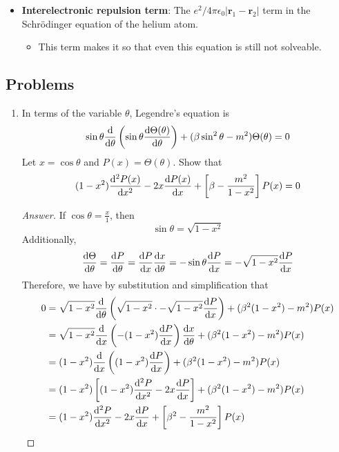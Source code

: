 \documentclass[../notes.tex]{subfiles}
\begin{document}
\begin{itemize}
\begin{equation*}
    \end{equation*}
    \item \textbf{Interelectronic repulsion term}: The $e^2/4\pi\epsilon_0|\mathbf{r}_1-\mathbf{r}_2|$ term in the Schr\"{o}dinger equation of the helium atom.
    \begin{itemize}
        \item This term makes it so that even this equation is still not solveable.
    \end{itemize}
\end{itemize}


\subsection*{Problems}
\begin{enumerate}[label={\textbf{6-\arabic*.}},ref={6-\arabic*}]
    \item \label{prb:6-2}In terms of the variable $\theta$, Legendre's equation is
    \begin{equation*}
        \sin\theta\dv{\theta}\left( \sin\theta\dv{\Theta(\theta)}{\theta} \right)+(\beta\sin^2\theta-m^2)\Theta(\theta) = 0
    \end{equation*}
    Let $x=\cos\theta$ and $P(x)=\Theta(\theta)$. Show that
    \begin{equation*}
        (1-x^2)\dv[2]{P(x)}{x}-2x\dv{P(x)}{x}+\left[ \beta-\frac{m^2}{1-x^2} \right]P(x) = 0
    \end{equation*}
    \begin{proof}[Answer]
        If $\cos\theta=\frac{x}{1}$, then
        \begin{equation*}
            \sin\theta = \sqrt{1-x^2}
        \end{equation*}
        Additionally,
        \begin{equation*}
            \dv{\Theta}{\theta} = \dv{P}{\theta}
            = \dv{P}{x}\dv{x}{\theta}
            = -\sin\theta\dv{P}{x}
            = -\sqrt{1-x^2}\dv{P}{x}
        \end{equation*}
        Therefore, we have by substitution and simplification that
        \begin{align*}
            0 &= \sqrt{1-x^2}\dv{\theta}\left( \sqrt{1-x^2}\cdot -\sqrt{1-x^2}\dv{P}{x} \right)+(\beta^2(1-x^2)-m^2)P(x)\\
            &= \sqrt{1-x^2}\dv{x}\left( -(1-x^2)\dv{P}{x} \right)\dv{x}{\theta}+(\beta^2(1-x^2)-m^2)P(x)\\
            &= (1-x^2)\dv{x}\left( (1-x^2)\dv{P}{x} \right)+(\beta^2(1-x^2)-m^2)P(x)\\
            &= (1-x^2)\left[ (1-x^2)\dv[2]{P}{x}-2x\dv{P}{x} \right]+(\beta^2(1-x^2)-m^2)P(x)\\
            &= (1-x^2)\dv[2]{P}{x}-2x\dv{P}{x}+\left[ \beta^2-\frac{m^2}{1-x^2} \right]P(x)
        \end{align*}
    \end{proof}
\end{enumerate}
\end{document}
